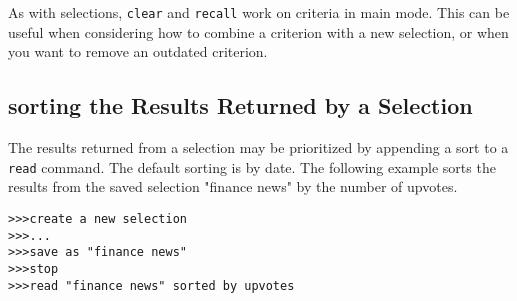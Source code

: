As with selections, \texttt{clear} and \texttt{recall} work on criteria in main mode. This can be useful when
considering how to combine a criterion with a new selection, or when you want to remove an
outdated criterion.

\subsection{sorting the Results Returned by a Selection}
The results returned from a selection may be prioritized by appending a sort to a \texttt{read} command.
The default sorting is by date. The following example sorts the results from the saved selection
"finance news" by the number of upvotes.
\newline\begin{minipage}{\linewidth}\begin{lstlisting}
>>>create a new selection
>>>...
>>>save as "finance news"
>>>stop
>>>read "finance news" sorted by upvotes
\end{lstlisting}\end{minipage}
